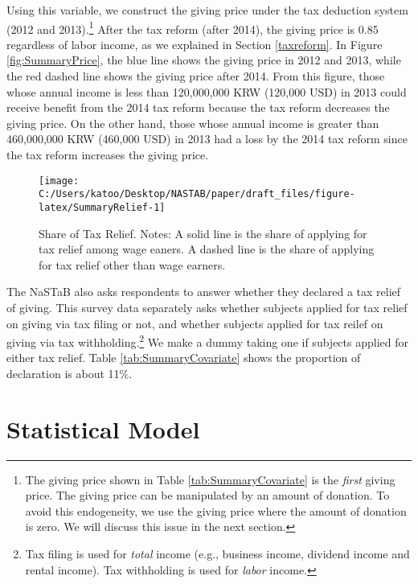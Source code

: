 \documentclass[
  11pt,
  a4paper,
]{article}
\begin{document}
Using this variable,
we construct the giving price
under the tax deduction system (2012 and 2013).\footnote{The giving price shown in Table \ref{tab:SummaryCovariate} is the \emph{first} giving price. The giving price can be manipulated by an amount of donation. To avoid this endogeneity, we use the giving price where the amount of donation is zero. We will discuss this issue in the next section.}
After the tax reform (after 2014),
the giving price is 0.85 regardless of labor income,
as we explained in Section \ref{taxreform}.
In Figure \ref{fig:SummaryPrice},
the blue line shows the giving price in 2012 and 2013,
while the red dashed line shows the giving price after 2014.
From this figure,
those whose annual income is less than 120,000,000 KRW
(120,000 USD) in 2013 could receive benefit from the 2014 tax reform
because the tax reform decreases the giving price.
On the other hand,
those whose annual income is greater than
460,000,000 KRW (460,000 USD) in 2013 had a loss by the 2014 tax reform
since the tax reform increases the giving price.

\begin{figure}[t]

{\centering \texttt{[image: C:/Users/katoo/Desktop/NASTAB/paper/draft\_files/figure-latex/SummaryRelief-1]} 

}

\caption{Share of Tax Relief. Notes: A solid line is the share of applying for tax relief among wage eaners. A dashed line is the share of applying for tax relief other than wage earners.}\label{fig:SummaryRelief}
\end{figure}

The NaSTaB also asks respondents
to answer whether they declared a tax relief of giving.
This survey data separately asks whether subjects applied for tax
relief on giving via tax filing or not,
and whether subjects applied for tax reilef on giving via tax withholding.\footnote{Tax filing is used for \emph{total} income (e.g., business income, dividend income and rental income). Tax withholding is used for \emph{labor} income.}
We make a dummy taking one if subjects applied for either tax relief.
Table \ref{tab:SummaryCovariate} shows
the proportion of declaration is about 11\%.

\hypertarget{statistical-model}{%
\section{Statistical Model}\label{statistical-model}}
\end{document}
